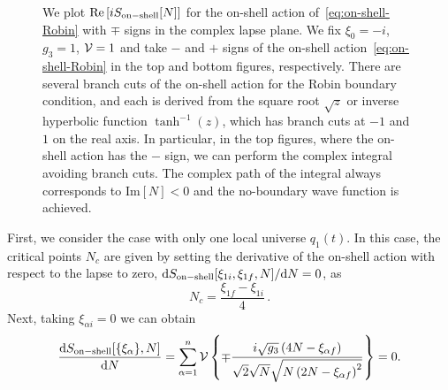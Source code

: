 \documentclass[superscriptaddress,aps,preprintnumbers,nofootinbib]{revtex4-2}
\begin{document}
\begin{figure}[t]
%
\caption{We plot $\textrm{Re}\left[iS_{\rm on-shell}[N]\right]$ for the on-shell action of~\eqref{eq:on-shell-Robin} with $\mp$ signs in the complex lapse plane. We fix $\xi_0=-i$, $g_3=1$, 
${\cal V}=1$ and take $-$ and $+$ signs of the on-shell action~\eqref{eq:on-shell-Robin} in the top and bottom figures, respectively. There are several branch cuts of the on-shell action for the Robin boundary condition, and each is derived from the square root $\sqrt{z}$ or inverse hyperbolic function $\tanh ^{-1}(z)$, which has branch cuts at $-1$ and $1$ on the real axis. In particular, in the top figures, where the on-shell action has the $-$ sign, we can perform the complex integral avoiding branch cuts. The complex path of the integral always corresponds to $\textrm{Im}[N] < 0$ and the no-boundary wave function is achieved.}
\label{fig:Picard-Lefschetz2}
\end{figure}


First, we consider the case with only one local universe $q_{1}(t)$. In this case, the critical points $N_c$ are given by setting the derivative of the on-shell action with respect to the lapse to zero, $\mathrm{d} S_{\rm on-shell} [\xi_{1 i},\xi_{1 f}, N]/\mathrm{d} N =0$, as 
\begin{equation}
N_c=\frac{\xi_{1 f}-\xi_{1 i}}{4} \,.
\end{equation}
Next, taking $\xi_{\alpha i}=0$ we can obtain  
\begin{align}
\frac{\mathrm{d} S_{\rm on-shell}[\{\xi_{\alpha}\}, N]}{\mathrm{d} N}
=\sum_{\alpha=1}^n{\cal V}\left\{\mp\frac{i \sqrt{g_3} \left(4 N-\xi_{\alpha f}\right)}{\sqrt{2} \sqrt{N} \sqrt{N \left(2 N-\xi_{\alpha f}\right)^2}}\right\}=0.
\end{align}
\end{document}
